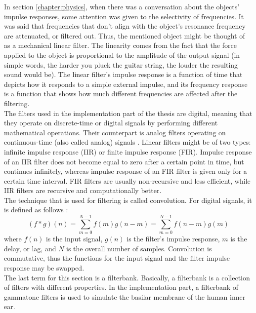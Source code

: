 In section \ref{chapter:physics}, when there was a conversation about the objects' impulse responses, some attention was given to the selectivity of frequencies. It was said that frequencies that don't align with the object's resonance frequency are attenuated, or filtered out. Thus, the mentioned object might be thought of as a mechanical linear filter. The linearity comes from the fact that the force applied to the object is proportional to the amplitude of the output signal (in simple words, the harder you pluck the guitar string, the louder the resulting sound would be). The linear filter's impulse response is a function of time that depicts how it responds to a simple external impulse, and its frequency response is a function that shows how much different frequencies are affected after the filtering.\\

The filters used in the implementation part of the thesis are digital, meaning that they ope\-rate on discrete-time or digital signals by performing different mathematical operations. Their counterpart is analog filters operating on continuous-time (also called analog) signals \cite{Shenoi2005}. Linear filters might be of two types: infinite impulse response (IIR) or finite impulse response (FIR). Impulse response of an IIR filter does not become equal to zero after a certain point in time, but continues infinitely, whereas impulse response of an FIR filter is given only for a certain time interval. FIR filters are usually non-recursive and less efficient, while IIR filters are recursive and computationally better.\\

The technique that is used for filtering is called convolution. For digital signals, it is defined as follows \cite{Schnupp2011}:
\begin{equation}
	(f*g)(n) = \sum_{m=0}^{N-1}f(m)g(n - m) = \sum_{m=0}^{N-1}f(n - m)g(m)
\end{equation}
where $f(n)$ is the input signal, $g(n)$ is the filter's impulse response, $m$ is the delay, or lag, and $N$ is the overall number of samples. Convolution is commutative, thus the functions for the input signal and the filter impulse response may be swapped.\\

The last term for this section is a filterbank. Basically, a filterbank is a collection of filters with different properties. In the implementation part, a filterbank of gammatone filters is used to simulate the basilar membrane of the human inner ear.

